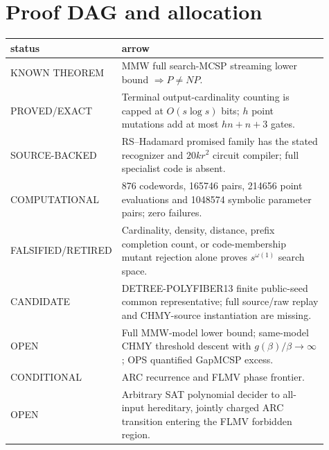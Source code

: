 \documentclass[11pt]{article}
\begin{document}
\section*{Proof DAG and allocation}
\begin{center}
\begin{tabular}{p{0.19\linewidth}p{0.72\linewidth}}
\toprule
status & arrow\\
\midrule
KNOWN THEOREM & MMW full search-MCSP streaming lower bound $\Rightarrow P\ne NP$.\\
PROVED/EXACT & Terminal output-cardinality counting is capped at
$O(s\log s)$ bits; $h$ point mutations add at most $hn+n+3$ gates.\\
SOURCE-BACKED & RS--Hadamard promised family has the stated recognizer and
$20kr^2$ circuit compiler; full specialist code is absent.\\
COMPUTATIONAL & 876 codewords, 165746 pairs, 214656 point evaluations and
1048574 symbolic parameter pairs; zero failures.\\
FALSIFIED/RETIRED & Cardinality, density, distance, prefix completion count,
or code-membership mutant rejection alone proves $s^{\omega(1)}$ search space.\\
CANDIDATE & DETREE-POLYFIBER13 finite public-seed common representative;
full source/raw replay and CHMY-source instantiation are missing.\\
OPEN & Full MMW-model lower bound; same-model CHMY threshold descent with
$g(\beta)/\beta\to\infty$; OPS quantified GapMCSP excess.\\
CONDITIONAL & ARC recurrence and FLMV phase frontier.\\
OPEN & Arbitrary SAT polynomial decider to all-input hereditary, jointly
charged ARC transition entering the FLMV forbidden region.\\
\bottomrule
\end{tabular}
\end{center}
\end{document}
